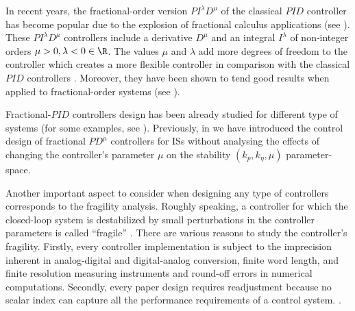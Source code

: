 \documentclass[twoside,reqno,11pt]{fcaa-var} %
\begin{document}
In recent years, the fractional-order version $PI^\lambda D^\mu$ of the classical $PID$ controller has become popular due to the explosion of fractional calculus applications (see \cite{Shah2016,Tepljakov2013,Guel-Cortez2018,Guel-Cortez2019}). These $PI^\lambda D^\mu$ controllers include a derivative $D^\mu$ and an integral $I^\lambda$ of non-integer orders $\mu>0,\lambda<0\in\R$. The values $\mu$ and $\lambda$ add more degrees of freedom to the controller which creates a more flexible controller in comparison with the classical $PID$ controllers \cite{valerio2013anintroduction}. Moreover, they have been shown to tend good results when applied to fractional-order systems (see \cite{Caponetto2010,Monje2010,Tavazoei2012,Guel-Cortez2018,Guel-Cortez2019}).\par Fractional-$PID$ controllers design has been already studied for different type of systems (for some examples, see \cite{Guel-Cortez2018,Guel-Cortez2019,Petras2019,GHORBANI20199302,Gao2019,Birs2019}). Previously, in \cite{Guel-Cortez2019a} we have introduced the control design of fractional $PD^\mu$ controllers for ISs without analysing the effects of changing the controller's parameter $\mu$ on the stability $(k_p,k_\eta,\mu)$ parameter-space. \par
Another important aspect to consider when designing any type of controllers corresponds to the fragility analysis. Roughly speaking, a controller for which the closed-loop system is destabilized by small perturbations in the controller parameters is called “fragile” \cite{mendez2008fragility}. There are various reasons to study the controller's fragility. Firstly, every controller implementation is subject to the imprecision inherent in analog-digital and digital-analog conversion, finite word length, and finite resolution measuring instruments and round-off errors in numerical computations. Secondly, every paper design requires readjustment because no scalar index can capture all the performance requirements of a control system. \cite{keel1997robust,alfaro2007pid,ho2000non}.\par 
\end{document}
